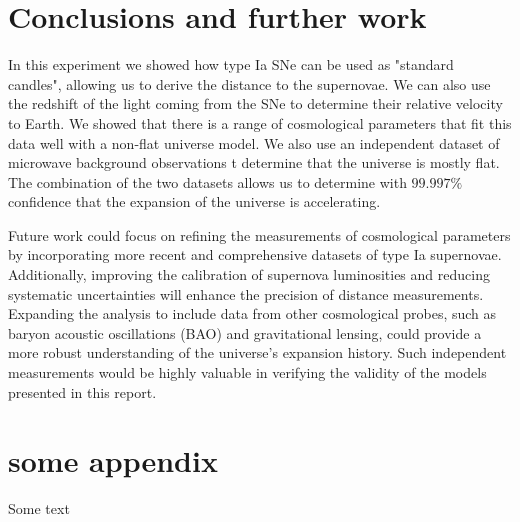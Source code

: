 \documentclass[11pt]{article}
\begin{document}
\section{Conclusions and further work}
In this experiment we showed how type Ia SNe can be used as "standard candles", allowing us to derive the distance to the supernovae. We can also use the redshift of the light coming from the SNe to determine their relative velocity to Earth. We showed that there is a range of cosmological parameters that fit this data well with a non-flat universe model. We also use an independent dataset of microwave background observations t determine that the universe is mostly flat. The combination of the two datasets allows us to determine with $99.997\%$ confidence that the expansion of the universe is accelerating. 

Future work could focus on refining the measurements of cosmological parameters by incorporating more recent and comprehensive datasets of type Ia supernovae. Additionally, improving the calibration of supernova luminosities and reducing systematic uncertainties will enhance the precision of distance measurements. Expanding the analysis to include data from other cosmological probes, such as baryon acoustic oscillations (BAO) and gravitational lensing, could provide a more robust understanding of the universe's expansion history. Such independent measurements would be highly valuable in verifying the validity of the models presented in this report. 




\newpage

\appendix
\section{some appendix} 
Some text
\end{document}
